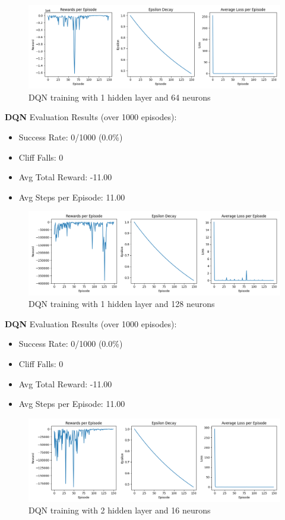 \documentclass[a4paper,12pt]{article}
\begin{document}
\begin{figure}[H]
    \centering
    \includegraphics[width=\linewidth]{1_64.png}
    \caption{DQN training with 1 hidden layer and 64 neurons}
\end{figure}
\textbf{DQN} Evaluation Results (over 1000 episodes):
\begin{itemize}
    \item Success Rate: 0/1000 (0.0\%)
    \item Cliff Falls: 0
    \item Avg Total Reward: -11.00
    \item Avg Steps per Episode: 11.00
\end{itemize}
\begin{figure}[H]
    \centering
    \includegraphics[width=\linewidth]{1_128.png}
    \caption{DQN training with 1 hidden layer and 128 neurons}
\end{figure}
\textbf{DQN} Evaluation Results (over 1000 episodes):
\begin{itemize}
    \item Success Rate: 0/1000 (0.0\%)
    \item Cliff Falls: 0
    \item Avg Total Reward: -11.00
    \item Avg Steps per Episode: 11.00
\end{itemize}
\begin{figure}[H]
    \centering
    \includegraphics[width=\linewidth]{2_16.png}
    \caption{DQN training with 2 hidden layer and 16 neurons}
\end{figure}
\end{document}
